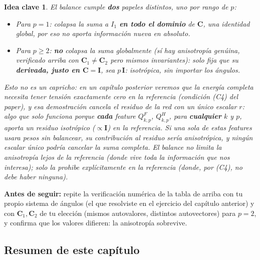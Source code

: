 \documentclass[11pt,a4paper]{article}
\newtheorem{takeaway}{Idea clave}
\begin{document}
\begin{takeaway}
El balance cumple \textbf{dos} papeles distintos, uno por rango de $p$:
\begin{itemize}
\item Para $p=1$: colapsa la suma a $I_1$ \textbf{en todo el dominio}
de $\bm C$, una identidad global, por eso no aporta informaci\'on
nueva en absoluto.
\item Para $p\geq2$: \textbf{no} colapsa la suma globalmente (s\'i hay
anisotrop\'ia gen\'uina, verificado arriba con $\bm C_1\neq\bm C_2$
pero mismos invariantes): solo fija que su \textbf{derivada, justo
en $\bm C=\bm I$}, sea $p\,\bm I$: isotr\'opica, sin importar los
\'angulos.
\end{itemize}
Esto no es un capricho: en un cap\'itulo posterior veremos que la
energ\'ia completa necesita tener tensi\'on exactamente cero en la
referencia (condici\'on (C4) del paper), y esa demostraci\'on cancela
el residuo de la red con un \'unico escalar $r$: algo que solo
funciona porque \textbf{cada} feature $Q^F_{k,p}$, $Q^H_{k,p}$, para
\textbf{cualquier} $k$ y $p$, aporta un residuo isotr\'opico ($\propto\bm I$)
en la referencia. Si una sola de estas features usara pesos sin
balancear, su contribuci\'on al residuo ser\'ia anisotr\'opica, y ning\'un
escalar \'unico podr\'ia cancelar la suma completa. El balance no
limita la anisotrop\'ia lejos de la referencia (donde vive toda la
informaci\'on que nos interesa); solo la prohibe expl\'icitamente
\emph{en} la referencia (donde, por (C4), no debe haber ninguna).
\end{takeaway}

\bigskip
\noindent\textbf{Antes de seguir:} repite la verificaci\'on num\'erica
de la tabla de arriba con tu propio sistema de \'angulos (el que
resolviste en el ejercicio del cap\'itulo anterior) y con $\bm C_1,\bm C_2$
de tu elecci\'on (mismos autovalores, distintos autovectores) para
$p=2$, y confirma que los valores difieren: la anisotrop\'ia
sobrevive.

\subsection{Resumen de este cap\'itulo}
\end{document}

